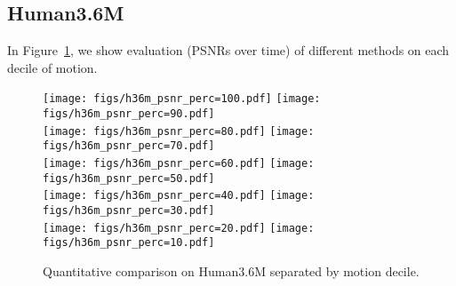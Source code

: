 \documentclass{article}
\begin{document}
\begin{appendix}
\begin{figure*}[!thbp]
\begin{subfigure}{0.12\linewidth}
	\end{subfigure}
    \caption{Qualitative evaluation of our network for long-term pixel-level generation. We show the actions of \texttt{tennis serve} (top row), \texttt{clean and jerk} (middle row), and \texttt{tennis forehand} (bottom row). We show a different timescale for \texttt{tennis forehand} because the ground-truth action sequence does not reach time step 65. Side by side video comparison can be found in our \href{https://goo.gl/U7UOfy}{project website}.}
\label{fig:penngtft2}
\vspace{-40pt}
\end{figure*}

\clearpage

\subsection{Human3.6M}\label{supp:h36m}
In Figure~\ref{fig:h36m_motion1}, we show evaluation (PSNRs over time) of different methods on each decile of motion.

\begin{figure}[htb!]
\centering
\texttt{[image: figs/h36m\_psnr\_perc=100.pdf]}
\hspace{.8cm}
\texttt{[image: figs/h36m\_psnr\_perc=90.pdf]} \\
\texttt{[image: figs/h36m\_psnr\_perc=80.pdf]}
\hspace{.8cm}
\texttt{[image: figs/h36m\_psnr\_perc=70.pdf]} \\
\texttt{[image: figs/h36m\_psnr\_perc=60.pdf]}
\hspace{.8cm}
\texttt{[image: figs/h36m\_psnr\_perc=50.pdf]} \\
\texttt{[image: figs/h36m\_psnr\_perc=40.pdf]}
\hspace{.8cm}
\texttt{[image: figs/h36m\_psnr\_perc=30.pdf]} \\
\texttt{[image: figs/h36m\_psnr\_perc=20.pdf]}
\hspace{.8cm}
\texttt{[image: figs/h36m\_psnr\_perc=10.pdf]}
\vspace{-.3cm}
\caption{Quantitative comparison on Human3.6M separated by motion decile.}
\label{fig:h36m_motion1}
\vspace{-2cm}
\end{figure}


\end{appendix}
\end{document}
